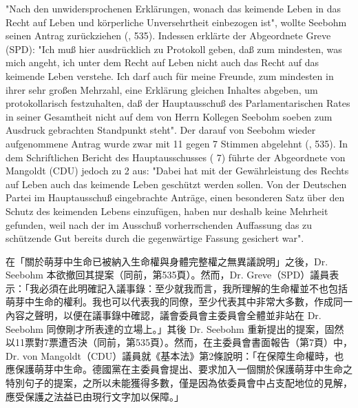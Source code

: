 \documentclass[12pt]{article}
\begin{document}
\syncleft
\begin{sourcepara}
"Nach den unwidersprochenen Erklärungen, wonach das keimende Leben in das Recht auf Leben und körperliche Unversehrtheit einbezogen ist", wollte \abbrDr{} Seebohm seinen Antrag zurückziehen (\abbrAAO{}, \abbrS{} 535). Indessen erklärte der Abgeordnete \abbrDr{} Greve (SPD): "Ich muß hier ausdrücklich zu Protokoll geben, daß zum mindesten, was mich angeht, ich unter dem Recht auf Leben nicht auch das Recht auf das keimende Leben verstehe. Ich darf auch für meine Freunde, zum mindesten in ihrer sehr großen Mehrzahl, eine Erklärung gleichen Inhaltes abgeben, um protokollarisch festzuhalten, daß der Hauptausschuß des Parlamentarischen Rates in seiner Gesamtheit nicht auf dem von Herrn Kollegen \abbrDr{} Seebohm soeben zum Ausdruck gebrachten Standpunkt steht". Der darauf von \abbrDr{} Seebohm wieder aufgenommene Antrag wurde zwar mit 11 gegen 7 Stimmen abgelehnt (\abbrAAO{}, \abbrS{} 535). In dem Schriftlichen Bericht des Hauptausschusses (\abbrS{} 7) führte der Abgeordnete \abbrDr{} von Mangoldt (CDU) jedoch zu \abbrArt{} 2 \abbrGG{} aus: "Dabei hat mit der Gewährleistung des Rechts auf Leben auch das keimende Leben geschützt werden sollen. Von der Deutschen Partei im Hauptausschuß eingebrachte Anträge, einen besonderen Satz über den Schutz des keimenden Lebens einzufügen, haben nur deshalb keine Mehrheit gefunden, weil nach der im Ausschuß vorherrschenden Auffassung das zu schützende Gut bereits durch die gegenwärtige Fassung gesichert war".
\end{sourcepara}
\begin{transpara}
在「關於萌芽中生命已被納入生命權與身體完整權之無異議說明」之後，Dr. Seebohm 本欲撤回其提案（同前，第535頁）。然而，Dr. Greve（SPD）議員表示：「我必須在此明確記入議事錄：至少就我而言，我所理解的生命權並不也包括萌芽中生命的權利。我也可以代表我的同僚，至少代表其中非常大多數，作成同一內容之聲明，以便在議事錄中確認，議會委員會主委員會全體並非站在 Dr. Seebohm 同僚剛才所表達的立場上。」其後 Dr. Seebohm 重新提出的提案，固然以11票對7票遭否決（同前，第535頁）。然而，在主委員會書面報告（第7頁）中，Dr. von Mangoldt（CDU）議員就《基本法》第2條說明：「在保障生命權時，也應保護萌芽中生命。德國黨在主委員會提出、要求加入一個關於保護萌芽中生命之特別句子的提案，之所以未能獲得多數，僅是因為依委員會中占支配地位的見解，應受保護之法益已由現行文字加以保障。」
\end{transpara}
\end{document}
